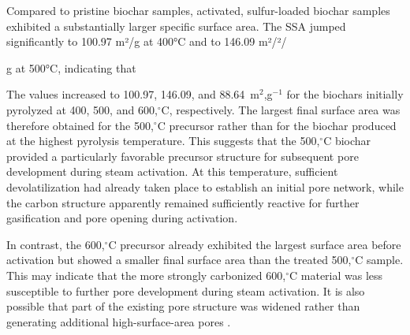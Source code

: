 \vspace{0.3em}

Compared to pristine biochar samples, activated, sulfur-loaded biochar samples exhibited a substantially larger specific surface area. The SSA jumped significantly to 100.97 m²/g at 400°C and to 146.09 m²/²/


g at 500°C, indicating that 


The values increased to 100.97, 146.09, and 88.64~m$^2$,g$^{-1}$ for the biochars initially pyrolyzed at 400, 500, and 600,$^\circ$C, respectively. The largest final surface area was therefore obtained for the 500,$^\circ$C precursor rather than for the biochar produced at the highest pyrolysis temperature. This suggests that the 500,$^\circ$C biochar provided a particularly favorable precursor structure for subsequent pore development during steam activation. At this temperature, sufficient devolatilization had already taken place to establish an initial pore network, while the carbon structure apparently remained sufficiently reactive for further gasification and pore opening during activation.

\vspace{0.3em}

In contrast, the 600,$^\circ$C precursor already exhibited the largest surface area before activation but showed a smaller final surface area than the treated 500,$^\circ$C sample. This may indicate that the more strongly carbonized 600,$^\circ$C material was less susceptible to further pore development during steam activation. It is also possible that part of the existing pore structure was widened rather than generating additional high-surface-area pores \parencite{Sajjadi2019}.





